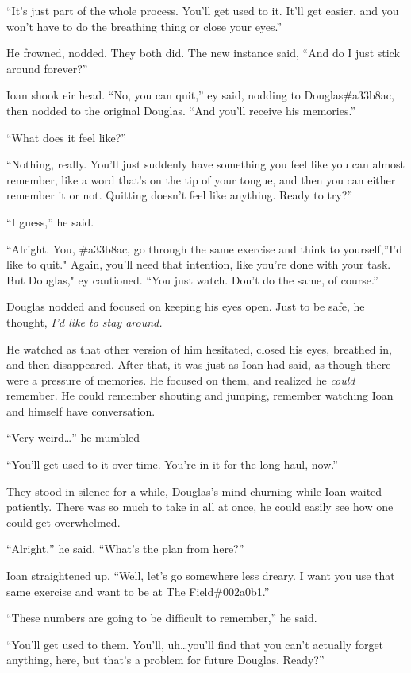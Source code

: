 ``It's just part of the whole process. You'll get used to it. It'll get easier, and you won't have to do the breathing thing or close your eyes.''

He frowned, nodded. They both did. The new instance said, ``And do I just stick around forever?''

Ioan shook eir head. ``No, you can quit,'' ey said, nodding to Douglas\#a33b8ac, then nodded to the original Douglas. ``And you'll receive his memories.''

``What does it feel like?''

``Nothing, really. You'll just suddenly have something you feel like you can almost remember, like a word that's on the tip of your tongue, and then you can either remember it or not. Quitting doesn't feel like anything. Ready to try?''

``I guess,'' he said.

``Alright. You, \#a33b8ac, go through the same exercise and think to yourself,''I'd like to quit." Again, you'll need that intention, like you're done with your task. But Douglas," ey cautioned. ``You just watch. Don't do the same, of course.''

Douglas nodded and focused on keeping his eyes open. Just to be safe, he thought, \emph{I'd like to stay around.}

He watched as that other version of him hesitated, closed his eyes, breathed in, and then disappeared. After that, it was just as Ioan had said, as though there were a pressure of memories. He focused on them, and realized he \emph{could} remember. He could remember shouting and jumping, remember watching Ioan and himself have conversation.

``Very weird\ldots{}'' he mumbled

``You'll get used to it over time. You're in it for the long haul, now.''

They stood in silence for a while, Douglas's mind churning while Ioan waited patiently. There was so much to take in all at once, he could easily see how one could get overwhelmed.

``Alright,'' he said. ``What's the plan from here?''

Ioan straightened up. ``Well, let's go somewhere less dreary. I want you use that same exercise and want to be at The Field\#002a0b1.''

``These numbers are going to be difficult to remember,'' he said.

``You'll get used to them. You'll, uh\ldots you'll find that you can't actually forget anything, here, but that's a problem for future Douglas. Ready?''

